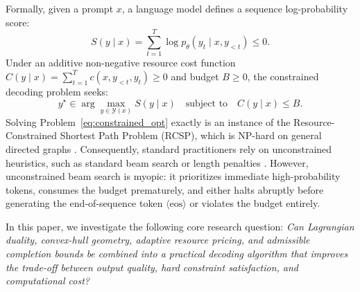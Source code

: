 \documentclass[11pt,a4paper]{article}
\theoremstyle{plain}
\theoremstyle{definition}
\theoremstyle{remark}
\begin{document}
Formally, given a prompt $x$, a language model defines a sequence log-probability score:
\begin{equation}
S(y \mid x) = \sum_{t=1}^T \log p_\theta(y_t \mid x, y_{<t}) \le 0.
\end{equation}
Under an additive non-negative resource cost function $C(y \mid x) = \sum_{t=1}^T c(x, y_{<t}, y_t) \ge 0$ and budget $B \ge 0$, the constrained decoding problem seeks:
\begin{equation}
\label{eq:constrained_opt}
y^\star \in \arg\max_{y \in \mathcal{Y}(x)} S(y \mid x) \quad \text{subject to} \quad C(y \mid x) \le B.
\end{equation}
Solving Problem~\eqref{eq:constrained_opt} exactly is an instance of the Resource-Constrained Shortest Path Problem (RCSP), which is NP-hard on general directed graphs \citep{handler1980dual, juttner2001lagrange}. Consequently, standard practitioners rely on unconstrained heuristics, such as standard beam search or length penalties \citep{wu2016google}. However, unconstrained beam search is myopic: it prioritizes immediate high-probability tokens, consumes the budget prematurely, and either halts abruptly before generating the end-of-sequence token $\langle\text{eos}\rangle$ or violates the budget entirely.

In this paper, we investigate the following core research question: \emph{Can Lagrangian duality, convex-hull geometry, adaptive resource pricing, and admissible completion bounds be combined into a practical decoding algorithm that improves the trade-off between output quality, hard constraint satisfaction, and computational cost?}
\end{document}
